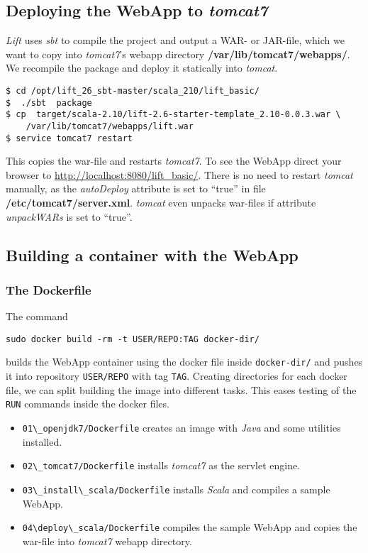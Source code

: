 \documentclass[11pt]{article}
\begin{document}
\subsection{Deploying the WebApp to \emph{tomcat7}}
\label{sec-3-4}

\emph{Lift} uses \emph{sbt} to compile the project and output a WAR- or JAR-file, which we want to copy into \emph{tomcat7}'s webapp directory \textbf{/var/lib/tomcat7/webapps/}. We recompile the package and deploy it statically into \emph{tomcat}.

\begin{verbatim}
$ cd /opt/lift_26_sbt-master/scala_210/lift_basic/
$  ./sbt  package
$ cp  target/scala-2.10/lift-2.6-starter-template_2.10-0.0.3.war \
    /var/lib/tomcat7/webapps/lift.war
$ service tomcat7 restart
\end{verbatim}
This copies the war-file and restarts \emph{tomcat7}. To see the WebApp direct your browser to \href{http://localhost:8080/lift_basic/}{http://localhost:8080/lift\_basic/}. There is no need to restart \emph{tomcat} manually, as the \emph{autoDeploy} attribute is set to ``true'' in file \textbf{/etc/tomcat7/server.xml}. \emph{tomcat} even unpacks war-files if attribute \emph{unpackWARs} is set to ``true''.
\subsection{Building a container with the WebApp}
\label{sec-3-5}
\subsubsection{The Dockerfile}
\label{sec-3-5-1}

The command 

\begin{verbatim}
sudo docker build -rm -t USER/REPO:TAG docker-dir/
\end{verbatim}
builds the WebApp container using the docker file inside \texttt{docker-dir/} and pushes it into repository \texttt{USER/REPO} with tag \texttt{TAG}. Creating directories for each docker file, we can split building the image into different tasks. This eases testing of the \texttt{RUN} commands inside the docker files. 
\begin{itemize}
\item \texttt{01\textbackslash{}\_openjdk7/Dockerfile} creates an image with \emph{Java} and some utilities installed.
\item \texttt{02\textbackslash{}\_tomcat7/Dockerfile} installs \emph{tomcat7} as the servlet engine.
\item \texttt{03\textbackslash{}\_install\textbackslash{}\_scala/Dockerfile} installs \emph{Scala} and compiles a sample WebApp.
\item \texttt{04\textbackslash{}deploy\textbackslash{}\_scala/Dockerfile}  compiles the sample WebApp and copies the war-file into \emph{tomcat7} webapp directory.
\end{itemize}
\end{document}
